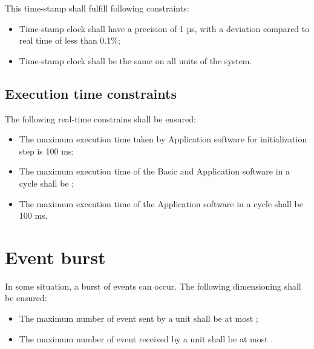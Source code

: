 This time-stamp shall fulfill
following constraints:
\begin{itemize}
\item Time-stamp clock shall have a precision of 1 µs, with a
  deviation compared to real time of less than 0.1\%;
\item Time-stamp clock shall be the same on all units of the system.
\end{itemize}

\subsection{Execution time constraints}

The following real-time constrains shall be ensured:
\begin{itemize}
\item The maximum execution time taken by Application software for
  initialization step is 100 ms;
\item The maximum execution time of the Basic and Application software
  in a cycle shall be ;
\item The maximum execution time of the Application software in a
  cycle shall be 100 ms.
\end{itemize}

\section{Event burst}

In some situation, a burst of events can occur. The following
dimensioning shall be ensured:
\begin{itemize}
\item The maximum number of event sent by a unit shall be at most
  ;
\item The maximum number of event received by a unit shall be at most
  .
\end{itemize}



